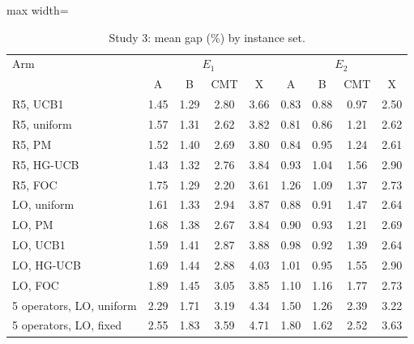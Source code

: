 \begin{table}[h]
\caption{Study 3: mean gap (\%) by instance set.}\label{tab:s3set}
\centering\small
\begin{adjustbox}{max width=\linewidth}
\begin{tabular}{lcccccccc}
\toprule
Arm & \multicolumn{4}{c}{$E_1$} & \multicolumn{4}{c}{$E_2$} \\
 & A & B & CMT & X & A & B & CMT & X \\
\midrule
R5, UCB1 & 1.45 & 1.29 & 2.80 & 3.66 & 0.83 & 0.88 & 0.97 & 2.50 \\
R5, uniform & 1.57 & 1.31 & 2.62 & 3.82 & 0.81 & 0.86 & 1.21 & 2.62 \\
R5, PM & 1.52 & 1.40 & 2.69 & 3.80 & 0.84 & 0.95 & 1.24 & 2.61 \\
R5, HG-UCB & 1.43 & 1.32 & 2.76 & 3.84 & 0.93 & 1.04 & 1.56 & 2.90 \\
R5, FOC & 1.75 & 1.29 & 2.20 & 3.61 & 1.26 & 1.09 & 1.37 & 2.73 \\
LO, uniform & 1.61 & 1.33 & 2.94 & 3.87 & 0.88 & 0.91 & 1.47 & 2.64 \\
LO, PM & 1.68 & 1.38 & 2.67 & 3.84 & 0.90 & 0.93 & 1.21 & 2.69 \\
LO, UCB1 & 1.59 & 1.41 & 2.87 & 3.88 & 0.98 & 0.92 & 1.39 & 2.64 \\
LO, HG-UCB & 1.69 & 1.44 & 2.88 & 4.03 & 1.01 & 0.95 & 1.55 & 2.90 \\
LO, FOC & 1.89 & 1.45 & 3.05 & 3.85 & 1.10 & 1.16 & 1.77 & 2.73 \\
5 operators, LO, uniform & 2.29 & 1.71 & 3.19 & 4.34 & 1.50 & 1.26 & 2.39 & 3.22 \\
5 operators, LO, fixed & 2.55 & 1.83 & 3.59 & 4.71 & 1.80 & 1.62 & 2.52 & 3.63 \\
\bottomrule
\end{tabular}
\end{adjustbox}
\end{table}
